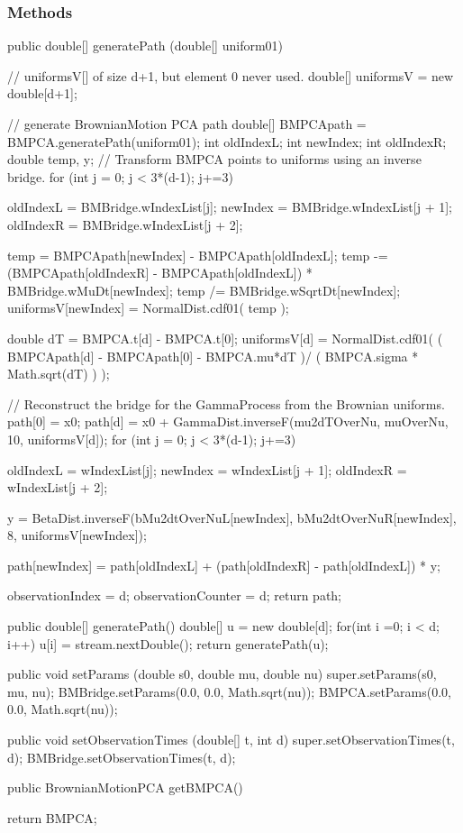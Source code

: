 \subsubsection* {Methods}
\begin{code}\begin{hide}

    public double[] generatePath (double[] uniform01) {
	// uniformsV[] of size d+1, but element 0 never used.
        double[] uniformsV = new double[d+1];

	// generate BrownianMotion PCA path
        double[] BMPCApath = BMPCA.generatePath(uniform01);
        int oldIndexL;
        int newIndex;
        int oldIndexR;
        double temp, y;
    // Transform BMPCA points to uniforms using an inverse bridge.
        for (int j = 0; j < 3*(d-1); j+=3) {
            oldIndexL   = BMBridge.wIndexList[j];
            newIndex    = BMBridge.wIndexList[j + 1];
            oldIndexR   = BMBridge.wIndexList[j + 2];

            temp = BMPCApath[newIndex] - BMPCApath[oldIndexL];
            temp -= (BMPCApath[oldIndexR] - BMPCApath[oldIndexL]) * BMBridge.wMuDt[newIndex];
            temp /= BMBridge.wSqrtDt[newIndex];
            uniformsV[newIndex] = NormalDist.cdf01( temp );
        }
	double dT = BMPCA.t[d] - BMPCA.t[0];
	uniformsV[d] = NormalDist.cdf01( ( BMPCApath[d] - BMPCApath[0] - BMPCA.mu*dT )/
					 ( BMPCA.sigma * Math.sqrt(dT) ) );


	// Reconstruct the bridge for the GammaProcess from the Brownian uniforms.
        path[0] = x0;
        path[d] = x0 + GammaDist.inverseF(mu2dTOverNu, muOverNu, 10, uniformsV[d]);
        for (int j = 0; j < 3*(d-1); j+=3) {
            oldIndexL   = wIndexList[j];
            newIndex    = wIndexList[j + 1];
            oldIndexR   = wIndexList[j + 2];

            y =  BetaDist.inverseF(bMu2dtOverNuL[newIndex],  bMu2dtOverNuR[newIndex], 8, uniformsV[newIndex]);

            path[newIndex] = path[oldIndexL] +
		(path[oldIndexR] - path[oldIndexL]) * y;
        }
        observationIndex   = d;
        observationCounter = d;
        return path;
    }


    public double[] generatePath()  {
        double[] u = new double[d];
        for(int i =0; i < d; i++)
            u[i] = stream.nextDouble();
        return generatePath(u);
    }


    public void setParams (double s0, double mu, double nu) {
        super.setParams(s0, mu, nu);
        BMBridge.setParams(0.0, 0.0, Math.sqrt(nu));
        BMPCA.setParams(0.0, 0.0, Math.sqrt(nu));
    }


    public void setObservationTimes (double[] t, int d) {
        super.setObservationTimes(t, d);
        BMBridge.setObservationTimes(t, d);
    }\end{hide}

    public BrownianMotionPCA getBMPCA() \begin{hide} {
        return BMPCA;
    }\end{hide}
\end{code}
